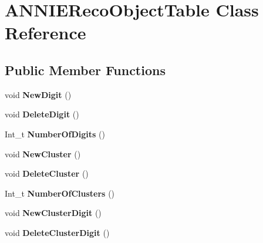 \hypertarget{classANNIERecoObjectTable}{\section{A\-N\-N\-I\-E\-Reco\-Object\-Table Class Reference}
\label{classANNIERecoObjectTable}
}
\subsection*{Public Member Functions}
\begin{DoxyCompactItemize}
\item 
\hypertarget{classANNIERecoObjectTable_ae2e86010f9f57ce6044d084ec40f475b}{void {\bfseries New\-Digit} ()}\label{classANNIERecoObjectTable_ae2e86010f9f57ce6044d084ec40f475b}

\item 
\hypertarget{classANNIERecoObjectTable_a75f289f8c9eef9098813dbdcc8ddd518}{void {\bfseries Delete\-Digit} ()}\label{classANNIERecoObjectTable_a75f289f8c9eef9098813dbdcc8ddd518}

\item 
\hypertarget{classANNIERecoObjectTable_a6a91ff418f86119ef35de20c5c9a9e8a}{Int\-\_\-t {\bfseries Number\-Of\-Digits} ()}\label{classANNIERecoObjectTable_a6a91ff418f86119ef35de20c5c9a9e8a}

\item 
\hypertarget{classANNIERecoObjectTable_a4bbb7e3eb5ca8a46486a1087ef2b4ff1}{void {\bfseries New\-Cluster} ()}\label{classANNIERecoObjectTable_a4bbb7e3eb5ca8a46486a1087ef2b4ff1}

\item 
\hypertarget{classANNIERecoObjectTable_a77fe22b611dbc374779bf258eae901a2}{void {\bfseries Delete\-Cluster} ()}\label{classANNIERecoObjectTable_a77fe22b611dbc374779bf258eae901a2}

\item 
\hypertarget{classANNIERecoObjectTable_a87c83bd73d95b7bc2fca9855e8604496}{Int\-\_\-t {\bfseries Number\-Of\-Clusters} ()}\label{classANNIERecoObjectTable_a87c83bd73d95b7bc2fca9855e8604496}

\item 
\hypertarget{classANNIERecoObjectTable_ae5d19c03be8a404512ddad75e76be951}{void {\bfseries New\-Cluster\-Digit} ()}\label{classANNIERecoObjectTable_ae5d19c03be8a404512ddad75e76be951}

\item 
\hypertarget{classANNIERecoObjectTable_ae9e239382fa31db834474b4307959f1b}{void {\bfseries Delete\-Cluster\-Digit} ()}\label{classANNIERecoObjectTable_ae9e239382fa31db834474b4307959f1b}


\end{DoxyCompactItemize}
